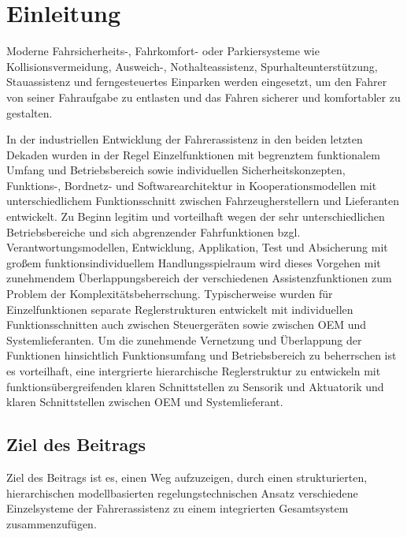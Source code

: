 \section{Einleitung}\label{S:Intro}

Moderne Fahrsicherheits-, Fahrkomfort- oder Parkiersysteme wie Kollisionsvermeidung, Ausweich-, Nothalteassistenz, Spurhalteunterstützung, Stauassistenz und ferngesteuertes Einparken werden eingesetzt, um den Fahrer von seiner Fahraufgabe zu entlasten und das Fahren sicherer und komfortabler zu gestalten. 

In der industriellen Entwicklung der Fahrerassistenz in den beiden letzten Dekaden wurden in der Regel Einzelfunktionen mit begrenztem funktionalem Umfang und Betriebsbereich sowie individuellen Sicherheitskonzepten, Funktions-, Bordnetz- und Softwarearchitektur in Kooperationsmodellen mit unterschiedlichem Funktionsschnitt zwischen Fahrzeugherstellern und Lieferanten entwickelt.  
Zu Beginn legitim und vorteilhaft wegen der sehr unterschiedlichen Betriebsbereiche und sich abgrenzender Fahrfunktionen bzgl. Verantwortungsmodellen, Entwicklung, Applikation, Test und Absicherung mit großem funktionsindividuellem Handlungsspielraum wird dieses Vorgehen mit zunehmendem Überlappungsbereich der verschiedenen Assistenzfunktionen zum Problem der Komplexitätsbeherrschung.
Typischerweise wurden für Einzelfunktionen separate Reglerstrukturen entwickelt mit individuellen Funktionsschnitten auch zwischen Steuergeräten sowie zwischen OEM und Systemlieferanten. Um die zunehmende Vernetzung und Überlappung der Funktionen hinsichtlich Funktionsumfang und Betriebsbereich zu beherrschen ist es vorteilhaft, eine intergrierte  hierarchische Reglerstruktur zu entwickeln mit funktionsübergreifenden klaren Schnittstellen zu Sensorik und Aktuatorik und klaren Schnittstellen zwischen OEM und Systemlieferant.  


\subsection{Ziel des Beitrags}
Ziel des Beitrags ist es, einen Weg aufzuzeigen, durch einen strukturierten, hierarchischen modellbasierten regelungstechnischen Ansatz verschiedene Einzelsysteme der Fahrerassistenz zu einem integrierten Gesamtsystem zusammenzufügen.

